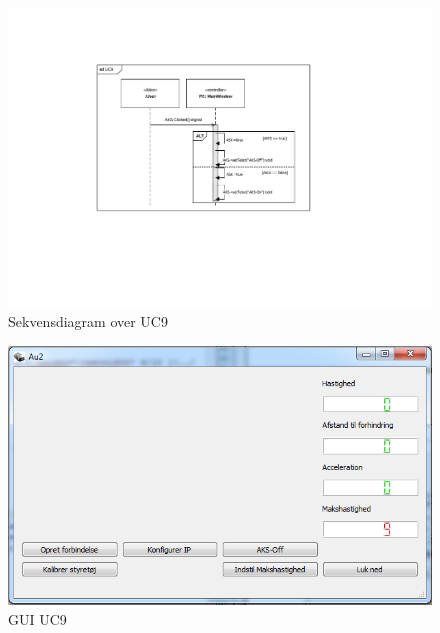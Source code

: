 \begin{figure}[H]
\centering
\includegraphics[width=\textwidth* 2/3,height=\textwidth* 4/10 ]{../fig/diagrammer/pc/sd_uc9.pdf}
\caption{Sekvensdiagram over UC9}
\label{fig:cd_uc9}
\end{figure}

\begin{figure}[H]
\centering
\includegraphics[width=\textwidth* 3/4,height=\textwidth* 9/20 ]{../fig/billeder/gui_uc9.png}
\caption{GUI UC9}
\label{fig:GUI_uc9}
\end{figure}

